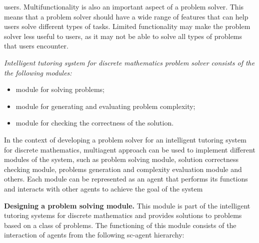 \documentclass[a4paper]{article}
\begin{document}
\begin{multicols}{2}
\begin{itemize}
users. Multifunctionality is also an important aspect
of a problem solver. This means that a problem
solver should have a wide range of features that can
help users solve different types of tasks. Limited
functionality may make the problem solver less
useful to users, as it may not be able to solve all
types of problems that users encounter.

\vspace{0.2cm}

\end{itemize}

\begin{center} \textit {Intelligent tutoring system for discrete mathematics
problem solver consists of the the following modules:}
\end{center}
\vspace{0.07cm}
\begin{itemize}
    \item module for solving problems;
    \item module for generating and evaluating problem complexity;
    \item module for checking the correctness of the solution.

\end{itemize}

\begin{justify}
In the context of developing a problem solver for
an intelligent tutoring system for discrete mathematics,
multiagent approach can be used to implement different
modules of the system, such as problem solving module,
solution correctness checking module, problems generation and complexity evaluation module and others. Each
module can be represented as an agent that performs its
functions and interacts with other agents to achieve the
goal of the system


  \textbf {Designing a problem solving module.} This module
is part of the intelligent tutoring systems for discrete
mathematics and provides solutions to problems based
on a class of problems.
The functioning of this module consists of the interaction of agents from the following sc-agent hierarchy:
\vspace{0.2cm}









\end{justify}
\end{multicols}
\end{document}
